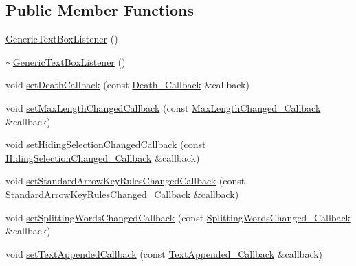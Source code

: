 \subsection*{Public Member Functions}
\begin{DoxyCompactItemize}
\item 
\mbox{\hyperlink{classec_1_1_generic_text_box_listener_a67a848ae0c82ca90d9e2fe7f515c5bce}{Generic\+Text\+Box\+Listener}} ()
\item 
\mbox{\hyperlink{classec_1_1_generic_text_box_listener_a80f94d0051b4214c9309997efc6b620c}{$\sim$\+Generic\+Text\+Box\+Listener}} ()
\item 
void \mbox{\hyperlink{classec_1_1_generic_text_box_listener_a8a807340857e0d0ab13aa8b0ddfb29b1}{set\+Death\+Callback}} (const \mbox{\hyperlink{classec_1_1_generic_text_box_listener_acef5d6f448ba7f8a90e56deed9e4be68}{Death\+\_\+\+Callback}} \&callback)
\item 
void \mbox{\hyperlink{classec_1_1_generic_text_box_listener_a5f9786e20c18f3080737c52cc56f2953}{set\+Max\+Length\+Changed\+Callback}} (const \mbox{\hyperlink{classec_1_1_generic_text_box_listener_ae0559ffa241ec16797f0554715b7b632}{Max\+Length\+Changed\+\_\+\+Callback}} \&callback)
\item 
void \mbox{\hyperlink{classec_1_1_generic_text_box_listener_aa369e0222c94c14977dd13166f2a5a67}{set\+Hiding\+Selection\+Changed\+Callback}} (const \mbox{\hyperlink{classec_1_1_generic_text_box_listener_aed51cf39c992e6c9fd7baa1df567504e}{Hiding\+Selection\+Changed\+\_\+\+Callback}} \&callback)
\item 
void \mbox{\hyperlink{classec_1_1_generic_text_box_listener_a9cbf2ac332c022e6070fb26465487a9b}{set\+Standard\+Arrow\+Key\+Rules\+Changed\+Callback}} (const \mbox{\hyperlink{classec_1_1_generic_text_box_listener_a1099a678278dd6c888d0ba18af73979b}{Standard\+Arrow\+Key\+Rules\+Changed\+\_\+\+Callback}} \&callback)
\item 
void \mbox{\hyperlink{classec_1_1_generic_text_box_listener_af4b822b94f926c6c1bccbade024015df}{set\+Splitting\+Words\+Changed\+Callback}} (const \mbox{\hyperlink{classec_1_1_generic_text_box_listener_ac4ce805fe48ae654108a7de04e310780}{Splitting\+Words\+Changed\+\_\+\+Callback}} \&callback)
\item 
void \mbox{\hyperlink{classec_1_1_generic_text_box_listener_a644d32f4ecdf11da00bcd9f509de5f7d}{set\+Text\+Appended\+Callback}} (const \mbox{\hyperlink{classec_1_1_generic_text_box_listener_a7bc50ee05522edf211ca7ce6a86f16c7}{Text\+Appended\+\_\+\+Callback}} \&callback)
\item 

\end{DoxyCompactItemize}
